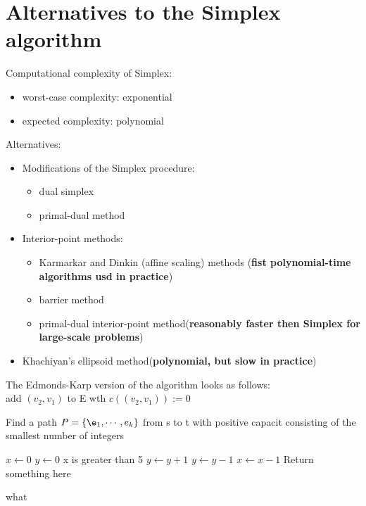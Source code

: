 \section{Alternatives to the Simplex algorithm}
Computational complexity of Simplex:
\begin{itemize}
        \item worst-case complexity: exponential
        \item expected complexity: polynomial
\end{itemize}
Alternatives:
\begin{itemize}
    \item Modifications of the Simplex procedure: 
        \begin{itemize}
            \item dual simplex
            \item primal-dual method
    \end{itemize}
\item Interior-point methods:
    \begin{itemize}
        \item Karmarkar and Dinkin (affine scaling) methods (\textbf{fist polynomial-time algorithms usd in practice})
        \item barrier method
        \item primal-dual interior-point method(\textbf{reasonably faster then Simplex for large-scale problems})
    \end{itemize}
\item Khachiyan's ellipsoid method(\textbf{polynomial, but slow in practice})
\end{itemize}


\begin{algorithm}[H]
\SetAlgoLined
\SetNoFillComment
{}
\vspace{3mm}
The Edmonds-Karp version of the algorithm looks as follows:\\
{
    {
        add $(v_2,v_1)$ to E wth $c((v_2,v_1)) := 0$
    }
}

\Repeat
Find a path $P = \{\e_1,\cdots ,e_k\}$ from s to t with positive capacit
consisting of the smallest number of integers



$x \leftarrow 0$\;
$y \leftarrow 0$\;
 {
    x is greater than 5 
}
 {
    $y \leftarrow y + 1$\;
}
 {
    $y \leftarrow y - 1$\;
}
 {
    $x \leftarrow x - 1$\;
}
\Return Return something here\;
\caption{what}
\end{algorithm}



